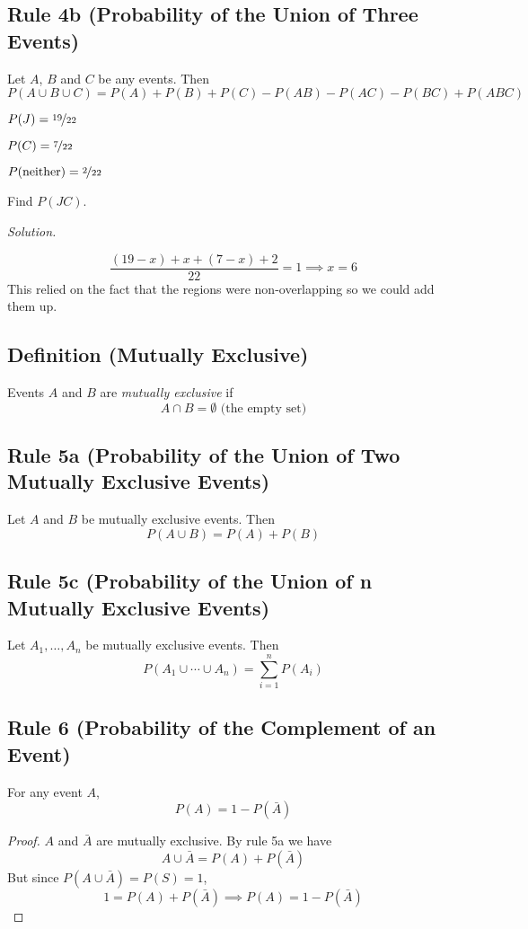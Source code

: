 \begin{thmbox}
    \subsection{Rule 4b (Probability of the Union of Three Events)}
    Let $ A $, $ B $ and $ C $ be any events. Then
    \[ P(A\cup B\cup C)=P(A)+P(B)+P(C)-P(AB)-P(AC)-P(BC)+P(ABC) \]
\end{thmbox}


$ P(J)=\nicefrac{19}{22}  $

$ P(C)=\nicefrac{7}{22} $

$ P(\text{neither})=\nicefrac{2}{22}  $

Find $ P(JC) $.

\emph{Solution.}

\[ \frac{(19-x)+x+(7-x)+2}{22}=1\implies x=6 \]
This relied on the fact that the regions were non-overlapping so we could add
them up.

\begin{defbox}
    \subsection{Definition (Mutually Exclusive)}
    Events $ A $ and $ B $ are \emph{mutually exclusive} if
    \[ A\cap B=\emptyset \text{ (the empty set)} \]
\end{defbox}

\begin{thmbox}
    \subsection{Rule 5a (Probability of the Union of Two Mutually Exclusive Events)}
    Let $ A $ and $ B $ be mutually exclusive events. Then
    \[ P(A\cup B)=P(A)+P(B) \]
\end{thmbox}

\begin{thmbox}
    \subsection{Rule 5c (Probability of the Union of n Mutually Exclusive Events)}
    Let $ A_1,\ldots ,A_n $ be mutually exclusive events. Then
    \[ P(A_1\cup \cdots \cup A_n)=\sum\limits_{i=1}^{n} P(A_i) \]
\end{thmbox}

\begin{thmbox}
    \subsection{Rule 6 (Probability of the Complement of an Event)}
    For any event $ A $,
    \[ P(A)=1-P(\bar{A}) \]
\end{thmbox}
\begin{proof}
    $ A $ and $ \bar{A} $ are mutually exclusive. By rule 5a we have
    \[ A\cup \bar{A}=P(A)+P(\bar{A}) \]
    But since $ P(A\cup \bar{A})=P(S)=1 $,
    \[ 1=P(A)+P(\bar{A})\implies P(A)=1-P(\bar{A}) \]
\end{proof}